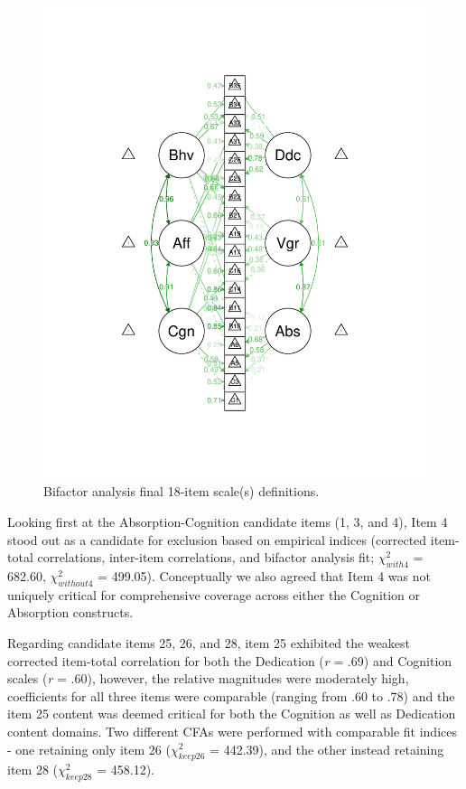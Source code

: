 \documentclass[
  man]{apa6}
\begin{document}
\begin{figure}
\centering
\includegraphics{20to18_files/figure-latex/19to18-1.pdf}
\caption{\label{fig:19to18}Bifactor analysis final 18-item scale(s) definitions.}
\end{figure}

Looking first at the Absorption-Cognition candidate items (1, 3, and 4), Item 4 stood out as a candidate for exclusion based on empirical indices (corrected item-total correlations, inter-item correlations, and bifactor analysis fit; \(\chi^2_{with4}\) = 682.60, \(\chi^2_{without4}\) = 499.05). Conceptually we also agreed that Item 4 was not uniquely critical for comprehensive coverage across either the Cognition or Absorption constructs.

Regarding candidate items 25, 26, and 28, item 25 exhibited the weakest corrected item-total correlation for both the Dedication (\emph{r} = .69) and Cognition scales (\emph{r} = .60), however, the relative magnitudes were moderately high, coefficients for all three items were comparable (ranging from .60 to .78) and the item 25 content was deemed critical for both the Cognition as well as Dedication content domains. Two different CFAs were performed with comparable fit indices - one retaining only item 26 (\(\chi^2_{keep26}\) = 442.39), and the other instead retaining item 28 (\(\chi^2_{keep28}\) = 458.12).
\end{document}
